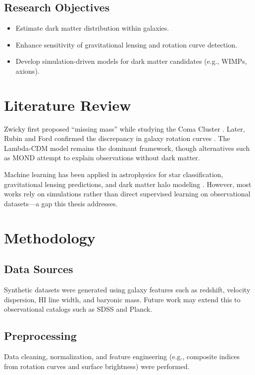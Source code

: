 \documentclass[12pt,a4paper]{report}
\begin{document}
\section{Research Objectives}
\begin{itemize}
  \item Estimate dark matter distribution within galaxies. 
  \item Enhance sensitivity of gravitational lensing and rotation curve detection. 
  \item Develop simulation-driven models for dark matter candidates (e.g., WIMPs, axions). 
\end{itemize}

\chapter{Literature Review}
Zwicky first proposed ``missing mass'' while studying the Coma Cluster \cite{zwicky1933}. Later, Rubin and Ford confirmed the discrepancy in galaxy rotation curves \cite{rubin1970}. 
The Lambda-CDM model \cite{peebles1993,dodelson2003} remains the dominant framework, though alternatives such as MOND \cite{famaey2012} attempt to explain observations without dark matter. 

Machine learning has been applied in astrophysics for star classification, gravitational lensing predictions, and dark matter halo modeling \cite{navarro1997,diemand2005}. However, most works rely on simulations rather than direct supervised learning on observational datasets---a gap this thesis addresses. 

\chapter{Methodology}
\section{Data Sources}
Synthetic datasets were generated using galaxy features such as redshift, velocity dispersion, HI line width, and baryonic mass. Future work may extend this to observational catalogs such as SDSS and Planck. 

\section{Preprocessing}
Data cleaning, normalization, and feature engineering (e.g., composite indices from rotation curves and surface brightness) were performed. 
\end{document}
